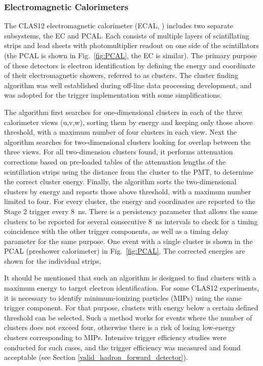 \subsubsection{Electromagnetic Calorimeters}
\label{sec:ECAL}

The CLAS12 electromagnetic calorimeter (ECAL, \cite{ec-ref}) includes two separate subsystems, the EC and PCAL. Each consists of multiple layers of scintillating strips and lead sheets with photomultiplier readout on one side of the scintillators (the PCAL is shown in Fig.~\ref{fig:PCAL}, the EC is similar). The primary purpose of these detectors is electron identification by defining the energy and coordinate of their electromagnetic showers, referred to as clusters. The cluster finding algorithm was well established during off-line data processing development, and was adopted for the trigger implementation with some simplifications.

The algorithm first searches for one-dimensional clusters in each of the three calorimeter views (u,v,w), sorting them by energy and keeping only those above threshold, with a maximum number of four clusters in each view. Next the algorithm searches for two-dimensional clusters looking for overlap between the three views. For all two-dimension clusters found, it performs attenuation corrections based on pre-loaded tables of the attenuation lengths of the scintillation strips using the distance from the cluster to the PMT, to deternime the correct cluster energy. Finally, the algorithm sorts the two-dimensional clusters by energy and reports those above threshold, with a maximum number limited to four. For every cluster, the energy and coordinates are reported to the Stage 2 trigger every 8~ns. There is a persistency parameter that allows the same clusters to be reported for several consecutive 8~ns intervals to check for a timing coincidence with the other trigger components, as well as a timing delay parameter for the same purpose. One event with a single cluster is shown in the PCAL (preshower calorimeter) in Fig.~\ref{fig:PCAL}. The corrected energies are shown for the individual strips.

It should be mentioned that such an algorithm is designed to find clusters with a maximum energy to target electron identification. For some CLAS12 experiments, it is necessary to identify minimum-ionizing particles (MIPs) using the same trigger component. For that purpose, clusters with energy below a certain defined threshold can be selected. Such a method works for events where the number of clusters does not exceed four, otherwise there is a risk of losing low-energy clusters corresponding to MIPs. Intensive trigger efficiency studies were conducted for such cases, and the trigger efficiency was measured and found acceptable (see Section \ref{valid_hadron_forward_detector}).


